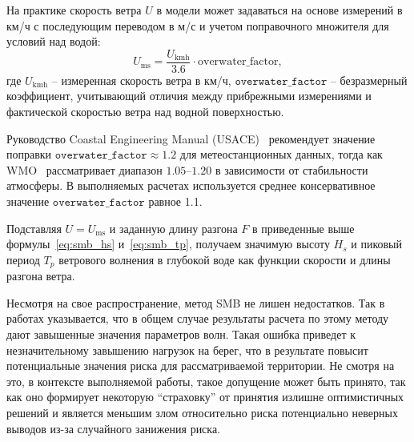 На практике скорость ветра $U$ в модели может задаваться на основе измерений в км/ч с последующим переводом в м/с и учетом поправочного множителя для условий над водой: 
\begin{equation}
    U_{\text{ms}} = \frac{U_{\text{kmh}}}{3.6}\cdot \text{overwater\_factor},
\end{equation}
где $U_{\text{kmh}}$ -- измеренная скорость ветра в км/ч, 
$\texttt{overwater\_factor}$ -- безразмерный коэффициент, учитывающий отличия между прибрежными измерениями и фактической скоростью ветра над водной поверхностью. 

Руководство Coastal Engineering Manual (USACE)~\cite{usace_cem_2006} рекомендует значение поправки $\texttt{overwater\_factor}\approx1.2$ для метеостанционных данных, тогда как WMO~\cite{wmo_wind_conversion_2010} рассматривает диапазон $1.05–1.20$ в зависимости от стабильности атмосферы. 
В выполняемых расчетах используется среднее консервативное значение $\texttt{overwater\_factor}$ равное 1.1.

Подставляя $U = U_{\text{ms}}$ и заданную длину разгона $F$ в приведенные выше формулы~\eqref{eq:smb_hs} и~\eqref{eq:smb_tp}, получаем значимую высоту $H_s$ и пиковый период $T_p$ ветрового волнения в глубокой воде как функции скорости и длины разгона ветра.

Несмотря на свое распространение, метод SMB не лишен недостатков.
Так в работах \cite{Bishop1992_SPM_WavePredictionReview, hurdle1989revision} указывается, что в общем случае результаты расчета по этому методу дают завышенные значения параметров волн.
Такая ошибка приведет к незначительному завышению нагрузок на берег, что в результате повысит потенциальные значения риска для рассматриваемой территории.
Не смотря на это, в контексте выполняемой работы, такое допущение может быть принято, так как оно формирует некоторую \enquote{страховку} от принятия излишне оптимистичных решений и является меньшим злом относительно риска потенциально неверных выводов из-за случайного занижения риска.  

